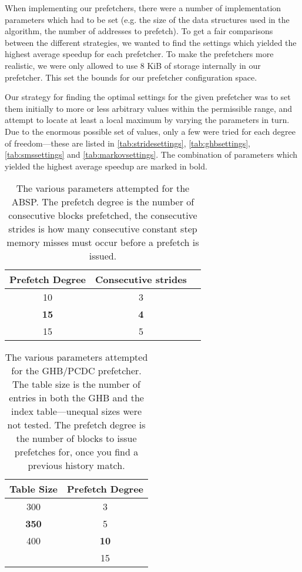 When implementing our prefetchers, there were a number of
implementation parameters which had to be set (e.g. the size of the
data structures used in the algorithm, the number of addresses to
prefetch). To get a fair comparisons between the different strategies,
we wanted to find the settings which yielded the highest average speedup for each
prefetcher. To make the prefetchers more realistic, we were only
allowed to use 8 KiB of storage internally in our prefetcher. This set
the bounds for our prefetcher configuration space. 

Our strategy for finding the optimal settings for the given prefetcher
was to set them initially to more or less arbitrary values within the
permissible range, and attempt to locate at least a local maximum by
varying the parameters in turn. Due to the enormous possible set of
values, only a few were tried for each degree of freedom---these are
listed in \autoref{tab:stridesettings}, \autoref{tab:ghbsettings},
\autoref{tab:smssettings} and \autoref{tab:markovsettings}. The
combination of parameters which yielded the highest average speedup
are marked in bold.

\begin{table}[htbp]
  \centering
  \begin{tabular}{|c|c|c|}
    \hline
    \textbf{Prefetch Degree} & \textbf{Consecutive strides} \\ \hline
    10 & 3 \\ \hline
    \textbf{15} & \textbf{4} \\ \hline
    15 & 5 \\ \hline %
  \end{tabular}
  \caption{The various parameters attempted for the ABSP. The prefetch degree is the number of consecutive blocks prefetched, the consecutive strides is how many consecutive constant step memory misses must occur before a prefetch is issued.}
  \label{tab:stridesettings}
\end{table}

\begin{table}[htbp]
  \centering
  \begin{tabular}{|c|c|}
    \hline
    \textbf{Table Size} & \textbf{Prefetch Degree} \\ \hline
    300 & 3 \\ \hline
    \textbf{350} & 5 \\ \hline
    400 & \textbf{10} \\ \hline
        & 15 \\ \hline
  \end{tabular}
  \caption{The various parameters attempted for the GHB/PCDC prefetcher. The table size is the number of entries in both the GHB and the index table---unequal sizes were not tested. The prefetch degree is the number of blocks to issue prefetches for, once you find a previous history match.}
  \label{tab:ghbsettings}
\end{table}

